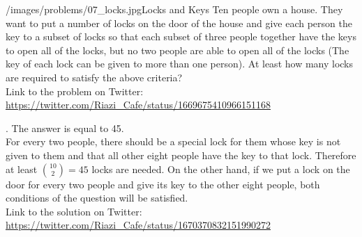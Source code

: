 \begin{problem}{/images/problems/07_locks.jpg}{Locks and Keys} Ten people own a house. They want to put a number of locks on the door of the house and give each person the key to a subset of locks so that each subset of three people together have the keys to open all of the locks, but no two people are able to open all of the locks (The key of each lock can be given to more than one person).  At least how many locks are required to satisfy the above criteria?\\[0.2cm]

Link to the problem on Twitter:  \url{https://twitter.com/Riazi_Cafe/status/1669675410966151168}\end{problem}
\begin{solution}.
The answer is equal to 45.\\[0.2cm]

For every two people, there should be a special lock for them whose key is not given to them and that all other eight people have the key to that lock. Therefore at least $\binom{10}{2} = 45$ locks are needed. On the other hand, if we put a lock on the door for every two people and give its key to the other eight people, both conditions of the question will be satisfied. \\[0.2cm]

Link to the solution on Twitter:  \url{https://twitter.com/Riazi_Cafe/status/1670370832151990272}\end{solution}
